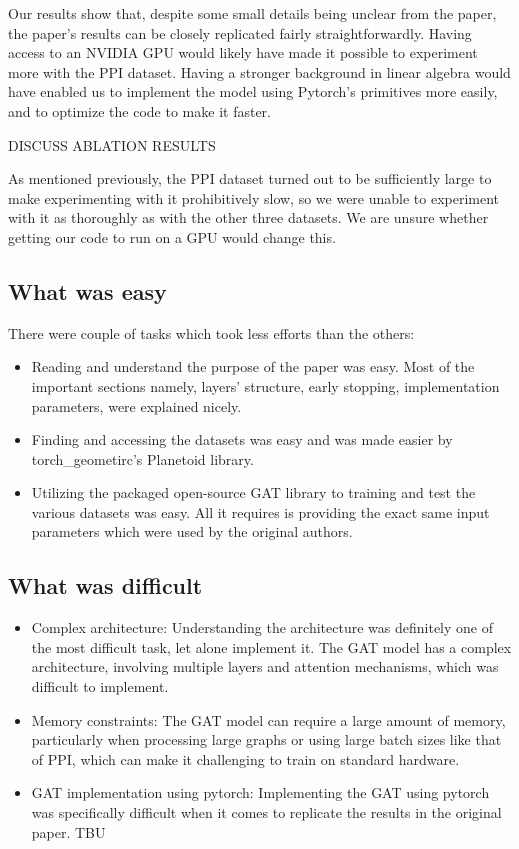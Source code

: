 Our results show that, despite some small details being unclear from the
paper, the paper's results can be closely replicated fairly
straightforwardly. Having access to an NVIDIA GPU would likely have made
it possible to experiment more with the PPI dataset. Having a stronger
background in linear algebra would have enabled us to implement the model
using Pytorch's primitives more easily, and to optimize the code to make it
faster.

DISCUSS ABLATION RESULTS

As mentioned previously, the PPI dataset turned out to be sufficiently
large to make experimenting with it prohibitively slow, so we were unable
to experiment with it as thoroughly as with the other three datasets. We
are unsure whether getting our code to run on a GPU would change this.

\subsection{What was easy}\label{subsec:what-was-easy}
There were couple of tasks which took less efforts than the others:
\begin{itemize}
    \item Reading and understand the purpose of the paper was easy. Most of the important sections
    namely, layers' structure, early stopping, implementation parameters, were explained nicely.
    \item Finding and accessing the datasets was easy and was made easier by torch\_geometirc's Planetoid library.
    \item Utilizing the packaged open-source GAT library to training and test the various datasets was easy.
    All it requires is providing the exact same input parameters which were used by the original authors.
\end{itemize}


\subsection{What was difficult}\label{subsec:what-was-difficult}
\begin{itemize}
    \item Complex architecture: Understanding the architecture was definitely one of the most difficult task, let alone implement it.
    The GAT model has a complex architecture, involving multiple layers and attention mechanisms, which was difficult to
    implement.
    \item Memory constraints: The GAT model can require a large amount of memory,
    particularly when processing large graphs or using large batch sizes like that of PPI, which can make it challenging
    to train on standard hardware.
    \item GAT implementation using pytorch: Implementing the GAT using pytorch was specifically difficult when it
    comes to replicate the results in the original paper. TBU
\end{itemize}
